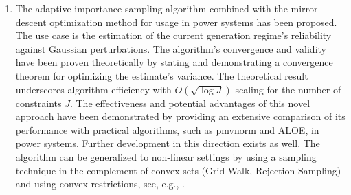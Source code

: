 \begin{enumerate}
    \item The adaptive importance sampling algorithm combined with the mirror descent optimization method for usage in power systems has been proposed. The use case is the estimation of the current generation regime's reliability against Gaussian perturbations.
        The algorithm's convergence and validity have been proven theoretically by stating and demonstrating a convergence theorem for optimizing the estimate's variance. The theoretical result underscores algorithm efficiency with $O\left( \sqrt{\log J} \right)$ scaling for the number of constraints $J$.
        The effectiveness and potential advantages of this novel approach have been demonstrated by providing an extensive comparison of its performance with practical algorithms, such as pmvnorm and ALOE, in power systems. Further development in this direction exists as well. The algorithm can be generalized to non-linear settings by using a sampling technique in the complement of convex sets (Grid Walk, Rejection Sampling) and using convex restrictions, see, e.g., \cite{lee2019convex}.
        

\end{enumerate}

